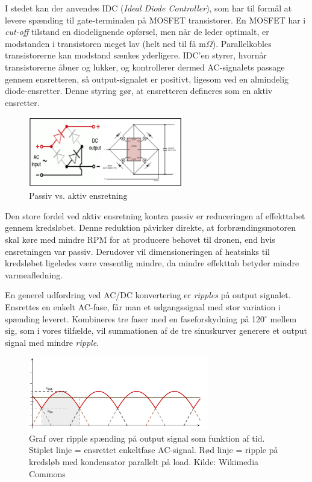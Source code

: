 I stedet kan der anvendes IDC (\textit{Ideal Diode Controller}), som har til formål at levere spænding til gate-terminalen på MOSFET transistorer. En MOSFET har i \textit{cut-off} tilstand en diodelignende opførsel, men når de leder optimalt, er modstanden i transistoren meget lav (helt ned til få m$\Omega$). Parallelkobles transistorerne kan modstand sænkes yderligere. IDC’en styrer, hvornår transistorerne åbner og lukker, og kontrollerer dermed AC-signalets passage gennem ensretteren, så output-signalet er positivt, ligesom ved en almindelig diode-ensretter. Denne styring gør, at ensretteren defineres som en aktiv ensretter.
\clearpage
\begin{figure}[h]
  \centering
  \includegraphics[width=0.6\textwidth]{./figurer/prens1.png}
  \caption{Passiv vs. aktiv ensretning}
  \label{fig:prens1}
\end{figure}

Den store fordel ved aktiv ensretning kontra passiv er reduceringen af effekttabet gennem kredsløbet. Denne reduktion påvirker direkte, at forbrændingsmotoren skal køre med mindre RPM for at producere behovet til dronen, end hvis ensretningen var passiv. Derudover vil dimensioneringen af heatsinks til kredsløbet ligeledes være væsentlig mindre, da mindre effekttab betyder mindre varmeafledning.  
  
En generel udfordring ved AC/DC konvertering er \textit{ripples} på output signalet. Ensrettes en enkelt AC-fase, får man et udgangssignal med stor variation i spænding leveret. Kombineres tre faser med en faseforskydning på 120$^\circ$ mellem sig, som i vores tilfælde, vil summationen af de tre sinuskurver generere et output signal med mindre \textit{ripple}.

\begin{figure}[h]
  \centering
  \includegraphics[width=0.7\textwidth]{./figurer/prens2.png}
  \caption{Graf over ripple spænding på output signal som funktion af tid. Stiplet linje = ensrettet enkeltfase
AC-signal. Rød linje = ripple på kredsløb med kondensator parallelt på load. Kilde: Wikimedia Commons}
  \label{fig:prens2}
\end{figure}

